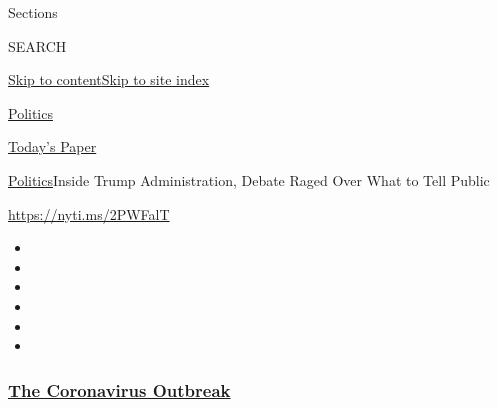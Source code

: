 Sections

SEARCH

\protect\hyperlink{site-content}{Skip to
content}\protect\hyperlink{site-index}{Skip to site index}

\href{https://www.nytimes3xbfgragh.onion/section/politics}{Politics}

\href{https://myaccount.nytimes3xbfgragh.onion/auth/login?response_type=cookie\&client_id=vi}{}

\href{https://www.nytimes3xbfgragh.onion/section/todayspaper}{Today's
Paper}

\href{/section/politics}{Politics}\textbar{}Inside Trump Administration,
Debate Raged Over What to Tell Public

\url{https://nyti.ms/2PWFalT}

\begin{itemize}
\item
\item
\item
\item
\item
\item
\end{itemize}

\hypertarget{the-coronavirus-outbreak}{%
\subsubsection{\texorpdfstring{\href{https://www.nytimes3xbfgragh.onion/news-event/coronavirus?name=styln-coronavirus-national\&region=TOP_BANNER\&block=storyline_menu_recirc\&action=click\&pgtype=Article\&impression_id=40616690-f297-11ea-96c9-f92c07a4cad0\&variant=undefined}{The
Coronavirus
Outbreak}}{The Coronavirus Outbreak}}\label{the-coronavirus-outbreak}}

